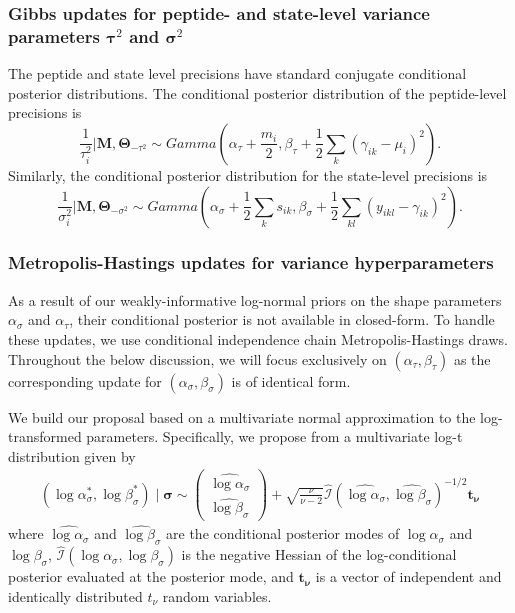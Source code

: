 \subsubsection{Gibbs updates for peptide- and state-level variance parameters $\bm \tau^2$ and $\bm \sigma^2$}

The peptide and state level precisions have standard conjugate conditional posterior distributions.
The conditional posterior distribution of the peptide-level precisions is 
\begin{equation*}
\frac{1}{\tau_{i}^{2}} | \bm M, \bm \Theta_{-\tau^2} \sim Gamma\left(\alpha_{\tau}+\frac{m_{i}}{2},\beta_{\tau}+\frac{1}{2}\sum_{k}(\gamma_{ik}-\mu_{i})^{2}\right) .
\end{equation*}
Similarly, the conditional posterior distribution for the state-level precisions is
\begin{equation*}
\frac{1}{\sigma_{i}^{2}} | \bm M, \bm \Theta_{-\sigma^2}  \sim Gamma\left(\alpha_{\sigma}+\frac{1}{2}\sum_{k}s_{ik},\beta_{\sigma}+\frac{1}{2}\sum_{kl}(y_{ikl}-\gamma_{ik})^{2}\right) .
\end{equation*}

\subsubsection{Metropolis-Hastings updates for variance hyperparameters}
\label{sec:var_hyperparam_updates}

As a result of our weakly-informative log-normal priors on the shape parameters $\alpha_\sigma$ and $\alpha_\tau$, their conditional posterior is not available in closed-form.
To handle these updates, we use conditional independence chain Metropolis-Hastings draws.
Throughout the below discussion, we will focus exclusively on $(\alpha_\tau, \beta_\tau)$ as the corresponding update for $(\alpha_\sigma, \beta_\sigma)$ is of identical form.

We build our proposal based on a multivariate normal approximation to the log-transformed parameters.
Specifically, we propose from a multivariate log-t distribution given by
\begin{eqnarray}
(\log \alpha_{\sigma}^*, \log \beta_{\sigma}^*) \mid \bm{\sigma} \sim \left(\begin{array}{c}
\widehat{\log\alpha_{\sigma}} \\
\widehat{\log\beta_{\sigma}}
\end{array}\right) +
\sqrt{\frac{\nu}{\nu - 2}} \hat{\mathcal{I}}(\widehat{\log\alpha_{\sigma}},\widehat{\log\beta_{\sigma}})^{-1/2} \bm{t_{\nu}} \label{eqn:alpha_and_beta_sigma_multivar_log_normal_prop}
\end{eqnarray}
where $\widehat{\log\alpha_{\sigma}}$ and $\widehat{\log\beta_{\sigma}}$ are the conditional posterior modes of $\log\alpha_{\sigma}$ and $\log\beta_\sigma$, $\hat{\mathcal{I}}(\log\alpha_\sigma,\log\beta_\sigma)$ is the negative Hessian of the log-conditional posterior evaluated at the posterior mode, and $\bm{t_{\nu}}$ is a vector of independent and identically distributed $t_{\nu}$ random variables.

